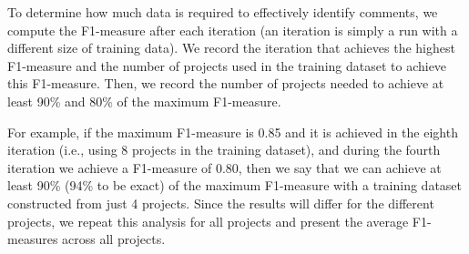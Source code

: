 To determine how much data is required to effectively identify \SATD comments, we compute the F1-measure after each iteration (an iteration is simply a run with a different size of training data). We record the iteration that achieves the highest F1-measure and the number of projects used in the training dataset to achieve this F1-measure. Then, we record the number of projects needed to achieve at least 90\% and 80\% of the maximum F1-measure.

For example, if the maximum F1-measure is 0.85 and it is achieved in the eighth iteration (i.e., using 8 projects in the training dataset), and during the fourth iteration we achieve a F1-measure of 0.80, then we say that we can achieve at least 90\% (94\% to be exact) of the maximum F1-measure with a training dataset constructed from just 4 projects. Since the results will differ for the different projects, we repeat this analysis for all projects and present the average F1-measures across all projects.


